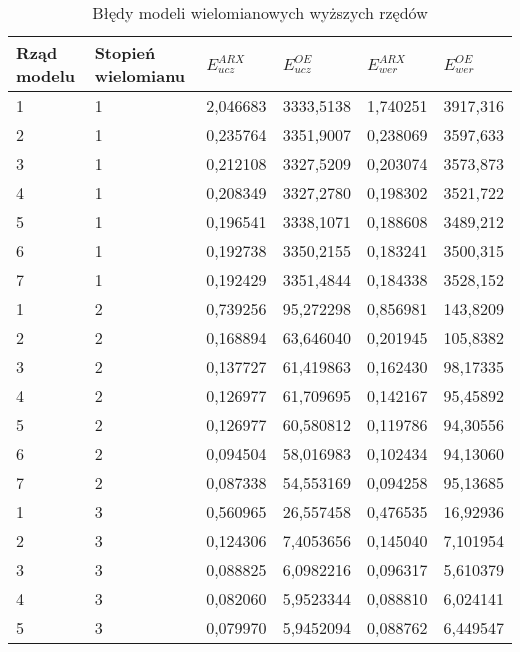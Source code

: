 \documentclass[a4paper,titlepage,11pt,floatssmall]{mwrep}
\begin{document}
\begin{table}[H]
\centering
\caption{Błędy modeli wielomianowych wyższych rzędów}
\begin{tabular}{|l|l|l|l|l|l|}
\hline
Rząd modelu & Stopień wielomianu & $E_{ucz}^{ARX}$    & $E_{ucz}^{OE}$     & $E_{wer}^{ARX}$    & $E_{wer}^{OE}$    \\ \hline
1           & 1             & 2,046683 & 3333,5138 & 1,740251 & 3917,316  \\ \hline
2           & 1             & 0,235764 & 3351,9007 & 0,238069 & 3597,633  \\ \hline
3           & 1             & 0,212108 & 3327,5209 & 0,203074 & 3573,873  \\ \hline
4           & 1             & 0,208349 & 3327,2780 & 0,198302 & 3521,722 \\ \hline
5           & 1             & 0,196541 & 3338,1071 & 0,188608 & 3489,212 \\ \hline
6           & 1             & 0,192738 & 3350,2155 & 0,183241 & 3500,315  \\ \hline
7           & 1             & 0,192429 & 3351,4844 & 0,184338 & 3528,152 \\ \hline
1           & 2             & 0,739256 & 95,272298 & 0,856981 & 143,8209 \\ \hline
2           & 2             & 0,168894 & 63,646040 & 0,201945 & 105,8382 \\ \hline
3           & 2             & 0,137727 & 61,419863 & 0,162430 & 98,17335 \\ \hline
4           & 2             & 0,126977 & 61,709695 & 0,142167 & 95,45892 \\ \hline
5           & 2             & 0,126977 & 60,580812 & 0,119786 & 94,30556 \\ \hline
6           & 2             & 0,094504 & 58,016983 & 0,102434 & 94,13060 \\ \hline
7           & 2             & 0,087338 & 54,553169 & 0,094258 & 95,13685 \\ \hline
1           & 3             & 0,560965 & 26,557458 & 0,476535 & 16,92936 \\ \hline
2           & 3             & 0,124306 & 7,4053656 & 0,145040 & 7,101954 \\ \hline
3           & 3             & 0,088825 & 6,0982216 & 0,096317 & 5,610379 \\ \hline
4           & 3             & 0,082060 & 5,9523344 & 0,088810 & 6,024141 \\ \hline
5           & 3             & 0,079970 & 5,9452094 & 0,088762 & 6,449547 \\ \hline

\end{tabular}
\end{table}
\end{document}
